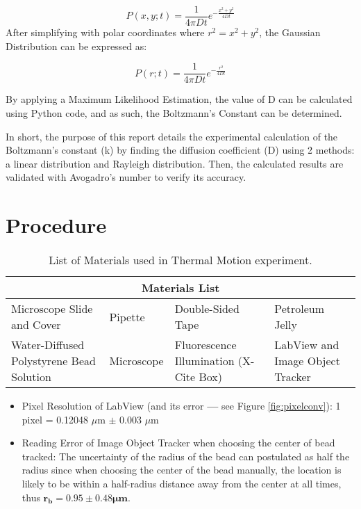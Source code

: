 \documentclass[12pt, letterpaper, twoside]{article}
\begin{document}
\begin{equation*}
    P(x,y;t) = \frac{1}{4\pi Dt}e^{-\frac{x^2+y^2}{4Dt}}
\end{equation*}
After simplifying with polar coordinates where $r^2 = x^2 + y^2$, the Gaussian Distribution can be expressed as:

\begin{equation}
    P(r;t) = \frac{1}{4\pi Dt}e^{-\frac{r^2}{4Dt}} \label{eq:2Dgaussian}
\end{equation}

By applying a Maximum Likelihood Estimation, the value of D can be calculated using Python code, and as such, the Boltzmann's Constant can be determined.

In short, the purpose of this report details the experimental calculation of the Boltzmann's constant (k) by finding the diffusion coefficient (D) using 2 methods: a linear distribution and Rayleigh distribution. Then, the calculated results are validated with Avogadro's number to verify its accuracy. 

\section{Procedure}\label{sec:Procedure}

\begin{table}[!ht]
    \centering
        \begin{tabular}{|p{3.5cm}|p{2.5cm}|p{4cm}|p{4cm}|}
            \multicolumn{4}{c}{\textbf{Materials List}}\\
            \hline
            Microscope Slide and Cover & Pipette & Double-Sided Tape & Petroleum Jelly  \\
            \hline
            Water-Diffused Polystyrene Bead Solution & Microscope & Fluorescence Illumination (X-Cite Box) & LabView and Image Object Tracker\\
            \hline
        \end{tabular}
        \caption{List of Materials used in Thermal Motion experiment.}
        \label{tab:my_label}
\end{table}
\begin{itemize}
    \item Pixel Resolution of LabView (and its error \textbf{---} see Figure \ref{fig:pixelconv}): 1 pixel = 0.12048 $\mu$m $\pm$ 0.003 $\mu$m
    \item Reading Error of Image Object Tracker when choosing the center of bead tracked: The uncertainty of the radius of the bead can postulated as half the radius since when choosing the center of the bead manually, the location is likely to be within a half-radius distance away from the center at all times, thus $\bm{r_b = 0.95 \pm 0.48 \mu m}$.
\end{itemize}
\end{document}
